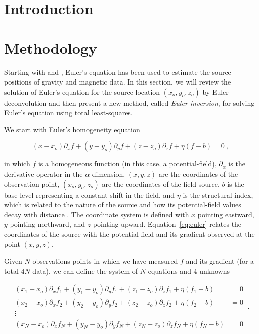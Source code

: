 \section{Introduction}


\section{Methodology}

Starting with \citet{Thompson1982} and \citet{Reid1990}, Euler's equation has
been used to estimate the source positions of gravity and magnetic data.
In this section, we will review the solution of Euler's equation for
the source location $(x_o, y_o, z_o)$ by Euler deconvolution \citep{Reid1990} and then present a
new method, called \textit{Euler inversion}, for solving Euler's equation using
total least-squares.

We start with Euler's homogeneity equation

\begin{equation}
  (x - x_o)\partial_x f + (y - y_o)\partial_y f + (z - z_o)\partial_z f
  + \eta(f - b) = 0
  \ ,
  \label{eq:euler}
\end{equation}

\noindent
in which $f$ is a homogeneous function (in this case, a potential-field),
$\partial_\alpha$ is the derivative operator in the $\alpha$ dimension,
$(x, y, z)$ are the coordinates of the observation point,
$(x_o, y_o, z_o)$ are the coordinates of the field source,
$b$ is the base level representing a constant shift in the field,
and $\eta$ is the structural index, which is related to the nature of the
source and how its potential-field values decay with distance
\citep{Ruddock1966,Reid2014}.
The coordinate system is defined with $x$ pointing eastward, $y$ pointing northward, and $z$ pointing upward.
Equation~\ref{eq:euler} relates the coordinates of the source with the
potential field and its gradient observed at the point $(x, y, z)$.

Given $N$ observations points in which we have measured $f$ and its gradient
(for a total $4N$ data), we can define the system of $N$ equations and $4$
unknowns

\begin{equation}
  \begin{aligned}
    (x_1-x_o)\partial_x f_1 + (y_1-y_o)\partial_y f_1 + (z_1-z_o)\partial_z f_1 + \eta(f_1-b) &= 0
    \\
    (x_2-x_o)\partial_x f_2 + (y_2-y_o)\partial_y f_2 + (z_2-z_o)\partial_z f_2 + \eta(f_2-b) &= 0
    \\
    \vdots
    \\
    (x_N-x_o)\partial_x f_N + (y_N-y_o)\partial_y f_N + (z_N-z_o)\partial_z f_N + \eta(f_N-b) &= 0
  \end{aligned}
  \ .
  \label{eq:euler-system}
\end{equation}

